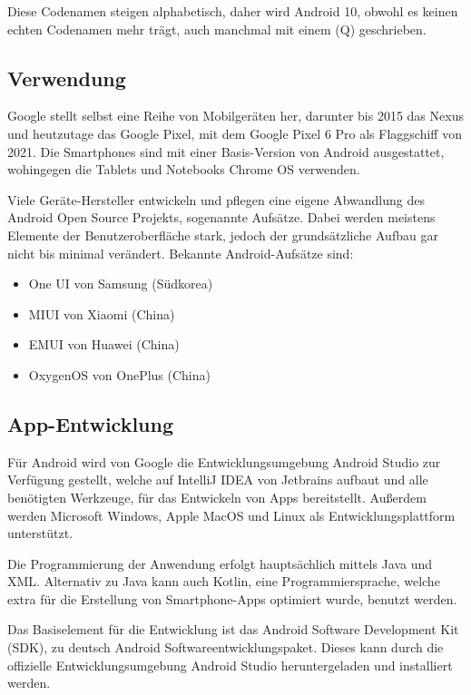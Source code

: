 Diese Codenamen steigen alphabetisch, daher wird Android 10, obwohl es keinen echten Codenamen mehr
trägt, auch manchmal mit einem (Q) geschrieben.

\subsection{Verwendung}
Google stellt selbst eine Reihe von Mobilgeräten her, darunter bis 2015 das Nexus und
heutzutage das Google Pixel, mit dem Google Pixel 6 Pro als Flaggschiff von 2021. Die Smartphones
sind mit einer Basis-Version von Android ausgestattet, wohingegen die Tablets und Notebooks Chrome
OS verwenden.

\newpage

Viele Geräte-Hersteller entwickeln und pflegen eine eigene Abwandlung des Android Open Source
Projekts, sogenannte Aufsätze. Dabei werden meistens Elemente der Benutzeroberfläche stark, jedoch
der grundsätzliche Aufbau gar nicht bis minimal verändert. Bekannte Android-Aufsätze sind:

\begin{itemize}
  \item One UI von Samsung (Südkorea)
  \item MIUI von Xiaomi (China)
  \item EMUI von Huawei (China)
  \item OxygenOS von OnePlus (China)
\end{itemize}

\subsection{App-Entwicklung}
Für Android wird von Google die Entwicklungsumgebung Android Studio zur Verfügung gestellt, welche
auf IntelliJ IDEA von Jetbrains aufbaut und alle benötigten Werkzeuge, für das Entwickeln
von Apps bereitstellt. Außerdem werden Microsoft Windows, Apple MacOS und Linux als
Entwicklungsplattform unterstützt.

Die Programmierung der Anwendung erfolgt hauptsächlich mittels Java und XML. Alternativ zu Java kann
auch Kotlin, eine Programmiersprache, welche extra für die Erstellung von Smartphone-Apps optimiert
wurde, benutzt werden.

Das Basiselement für die Entwicklung ist das Android Software Development Kit (SDK), zu deutsch
Android Softwareentwicklungspaket. Dieses kann durch die offizielle Entwicklungsumgebung Android
Studio heruntergeladen und installiert werden.
